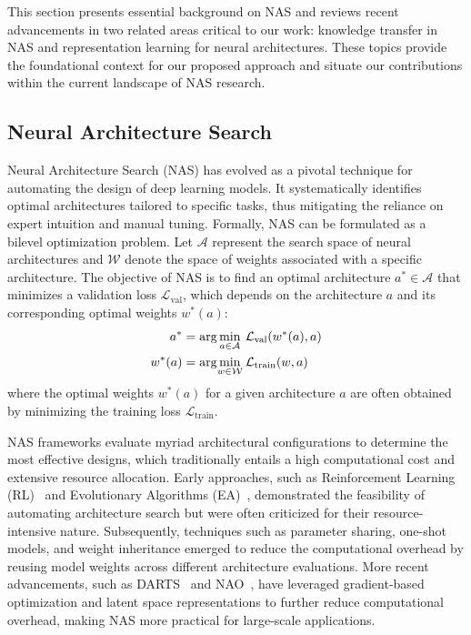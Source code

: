 \documentclass[../main.tex]{subfiles}
\begin{document}
This section presents essential background on NAS and reviews recent advancements in two related areas critical to our work: knowledge transfer in NAS and representation learning for neural architectures. These topics provide the foundational context for our proposed approach and situate our contributions within the current landscape of NAS research.

\subsection{Neural Architecture Search}

Neural Architecture Search (NAS) has evolved as a pivotal technique for automating the design of deep learning models.
It systematically identifies optimal architectures tailored to specific tasks, thus mitigating the reliance on expert intuition and manual tuning.
Formally, NAS can be formulated as a bilevel optimization problem.
Let \( \mathcal{A} \) represent the search space of neural architectures and \( \mathcal{W} \) denote the space of weights associated with a specific architecture.
The objective of NAS is to find an optimal architecture \( a^* \in \mathcal{A} \) that minimizes a validation loss \( \mathcal{L}_\mathrm{val} \), which depends on the architecture \( a \) and its corresponding optimal weights \( w^*(a) \):
\begin{equation}
	\begin{aligned}
		a^*    & = \arg\min_{\mathclap{a \in \mathcal{A}}} \: \mathcal{L}_\mathrm{val}(w^*(a), a) \\
		w^*(a) & = \arg\min_{\mathclap{w \in \mathcal{W}}} \: \mathcal{L}_\mathrm{train}(w, a)
	\end{aligned}
\end{equation}
where the optimal weights \( w^*(a) \) for a given architecture \( a \) are often obtained by minimizing the training loss \( \mathcal{L}_\mathrm{train} \).

NAS frameworks evaluate myriad architectural configurations to determine the most effective designs, which traditionally entails a high computational cost and extensive resource allocation.
Early approaches, such as Reinforcement Learning (RL)~\cite{DBLP:conf/iclr/ZophL17,DBLP:conf/cvpr/ZophVSL18,Gao2019GraphNASGN,Lyu2021MultiobjectiveRL,Hsu2018MONASMN} and Evolutionary Algorithms (EA)~\cite{Liu2020ASO,DBLP:conf/aaai/RealAHL19,DBLP:journals/tec/ZhouQGT21,DBLP:conf/iconip/HouDFQ21,DBLP:journals/tnn/DongHFTTO23}, demonstrated the feasibility of automating architecture search but were often criticized for their resource-intensive nature.
Subsequently, techniques such as parameter sharing, one-shot models, and weight inheritance emerged to reduce the computational overhead by reusing model weights across different architecture evaluations.
More recent advancements, such as DARTS~\cite{DBLP:conf/iclr/LiuSY19} and NAO~\cite{DBLP:conf/nips/LuoTQCL18}, have leveraged gradient-based optimization and latent space representations to further reduce computational overhead, making NAS more practical for large-scale applications.
\end{document}
